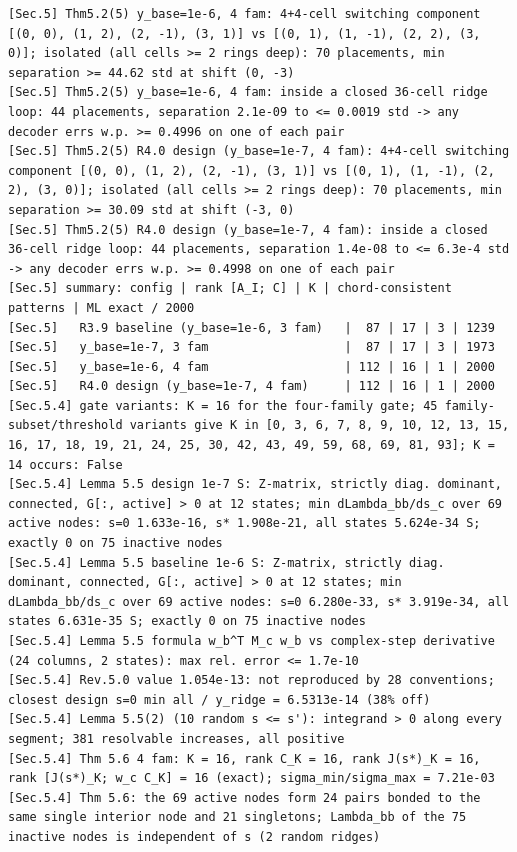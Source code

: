 \documentclass[11pt,a4paper]{article}
\theoremstyle{definition}
\theoremstyle{remark}
\begin{document}
\begin{lstlisting}[style=consolestyle]
[Sec.5] Thm5.2(5) y_base=1e-6, 4 fam: 4+4-cell switching component [(0, 0), (1, 2), (2, -1), (3, 1)] vs [(0, 1), (1, -1), (2, 2), (3, 0)]; isolated (all cells >= 2 rings deep): 70 placements, min separation >= 44.62 std at shift (0, -3)
[Sec.5] Thm5.2(5) y_base=1e-6, 4 fam: inside a closed 36-cell ridge loop: 44 placements, separation 2.1e-09 to <= 0.0019 std -> any decoder errs w.p. >= 0.4996 on one of each pair
[Sec.5] Thm5.2(5) R4.0 design (y_base=1e-7, 4 fam): 4+4-cell switching component [(0, 0), (1, 2), (2, -1), (3, 1)] vs [(0, 1), (1, -1), (2, 2), (3, 0)]; isolated (all cells >= 2 rings deep): 70 placements, min separation >= 30.09 std at shift (-3, 0)
[Sec.5] Thm5.2(5) R4.0 design (y_base=1e-7, 4 fam): inside a closed 36-cell ridge loop: 44 placements, separation 1.4e-08 to <= 6.3e-4 std -> any decoder errs w.p. >= 0.4998 on one of each pair
[Sec.5] summary: config | rank [A_I; C] | K | chord-consistent patterns | ML exact / 2000
[Sec.5]   R3.9 baseline (y_base=1e-6, 3 fam)   |  87 | 17 | 3 | 1239
[Sec.5]   y_base=1e-7, 3 fam                   |  87 | 17 | 3 | 1973
[Sec.5]   y_base=1e-6, 4 fam                   | 112 | 16 | 1 | 2000
[Sec.5]   R4.0 design (y_base=1e-7, 4 fam)     | 112 | 16 | 1 | 2000
[Sec.5.4] gate variants: K = 16 for the four-family gate; 45 family-subset/threshold variants give K in [0, 3, 6, 7, 8, 9, 10, 12, 13, 15, 16, 17, 18, 19, 21, 24, 25, 30, 42, 43, 49, 59, 68, 69, 81, 93]; K = 14 occurs: False
[Sec.5.4] Lemma 5.5 design 1e-7 S: Z-matrix, strictly diag. dominant, connected, G[:, active] > 0 at 12 states; min dLambda_bb/ds_c over 69 active nodes: s=0 1.633e-16, s* 1.908e-21, all states 5.624e-34 S; exactly 0 on 75 inactive nodes
[Sec.5.4] Lemma 5.5 baseline 1e-6 S: Z-matrix, strictly diag. dominant, connected, G[:, active] > 0 at 12 states; min dLambda_bb/ds_c over 69 active nodes: s=0 6.280e-33, s* 3.919e-34, all states 6.631e-35 S; exactly 0 on 75 inactive nodes
[Sec.5.4] Lemma 5.5 formula w_b^T M_c w_b vs complex-step derivative (24 columns, 2 states): max rel. error <= 1.7e-10
[Sec.5.4] Rev.5.0 value 1.054e-13: not reproduced by 28 conventions; closest design s=0 min all / y_ridge = 6.5313e-14 (38% off)
[Sec.5.4] Lemma 5.5(2) (10 random s <= s'): integrand > 0 along every segment; 381 resolvable increases, all positive
[Sec.5.4] Thm 5.6 4 fam: K = 16, rank C_K = 16, rank J(s*)_K = 16, rank [J(s*)_K; w_c C_K] = 16 (exact); sigma_min/sigma_max = 7.21e-03
[Sec.5.4] Thm 5.6: the 69 active nodes form 24 pairs bonded to the same single interior node and 21 singletons; Lambda_bb of the 75 inactive nodes is independent of s (2 random ridges)

\end{lstlisting}
\end{document}
